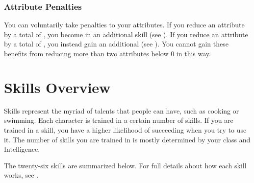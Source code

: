         \subsubsection{Attribute Penalties}\label{Attribute Penalties}
            You can voluntarily take penalties to your attributes.
            If you reduce an attribute by a total of , you become  in an additional skill (see ).
            If you reduce an attribute by a total of , you instead gain an additional  (see ).
            You cannot gain these benefits from reducing more than two attributes below 0 in this way.

\section{Skills Overview}
    Skills represent the myriad of talents that people can have, such as cooking or swimming.
    Each character is trained in a certain number of skills.
    If you are trained in a skill, you have a higher likelihood of succeeding when you try to use it.
    The number of skills you are trained in is mostly determined by your class and Intelligence.

    The twenty-six skills are summarized below.
    For full details about how each skill works, see .

